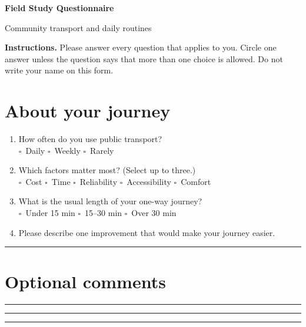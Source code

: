 \documentclass[11pt,a4paper]{article}
\newcommand{\boxoption}{\(\square\)}
\begin{document}
\begin{center}
  {\LARGE\bfseries Field Study Questionnaire}\par
  \vspace{.25cm}
  {\large Community transport and daily routines}\par
\end{center}
\noindent\textbf{Instructions.} Please answer every question that applies to
you. Circle one answer unless the question says that more than one choice is
allowed. Do not write your name on this form.

\section*{About your journey}
\begin{enumerate}[leftmargin=*,label=\textbf{Q\arabic*.}]
  \item How often do you use public transport?\\
    \boxoption\ Daily \qquad \boxoption\ Weekly \qquad \boxoption\ Rarely
  \item Which factors matter most? (Select up to three.)\\
    \boxoption\ Cost \quad \boxoption\ Time \quad \boxoption\ Reliability
    \quad \boxoption\ Accessibility \quad \boxoption\ Comfort
  \item What is the usual length of your one-way journey?\\
    \boxoption\ Under 15 min \quad \boxoption\ 15--30 min
    \quad \boxoption\ Over 30 min
  \item Please describe one improvement that would make your journey easier.
\end{enumerate}
\vspace{1.7cm}\hrule\vspace{1.7cm}

\section*{Optional comments}
\noindent\rule{\linewidth}{.4pt}\par\vspace{.65cm}
\noindent\rule{\linewidth}{.4pt}\par\vspace{.65cm}
\noindent\rule{\linewidth}{.4pt}
\end{document}
